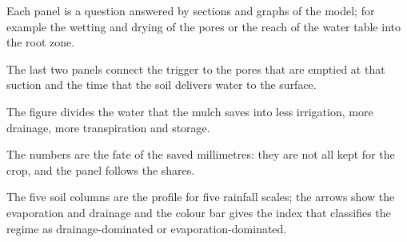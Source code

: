 Each panel is a question answered by sections and graphs of the model; for example the wetting and drying of the pores or the reach of the water table into the root zone.


The last two panels connect the trigger to the pores that are emptied at that suction and the time that the soil delivers water to the surface.


The figure divides the water that the mulch saves into less irrigation, more drainage, more transpiration and storage.


The numbers are the fate of the saved millimetres: they are not all kept for the crop, and the panel follows the shares.


The five soil columns are the profile for five rainfall scales; the arrows show the evaporation and drainage and the colour bar gives the index that classifies the regime as drainage-dominated or evaporation-dominated.


